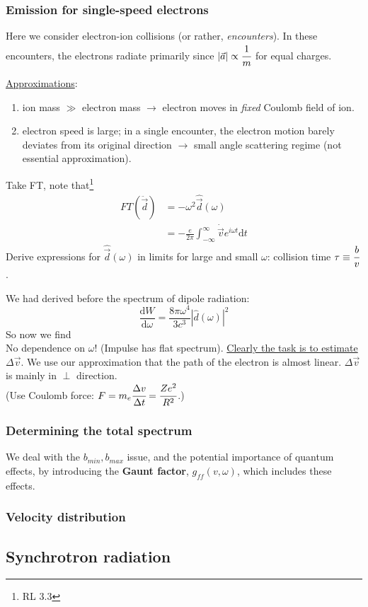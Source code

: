 \documentclass[12pt]{article}
\newcommand{\mar}[1]{\hspace{0pt}\marginpar{-\textcolor{black}{#1}-}}
\begin{document}
\subsubsection{Emission for single-speed electrons}
\mar{146}
Here we consider electron-ion collisions (or rather, \emph{encounters}).
In these encounters, the electrons radiate primarily since
$ |\vec{a}| \propto \cfrac{1}{m} $ for equal charges.

\underline{Approximations}:
\begin{enumerate}
    \item ion mass $\gg$ electron mass $\rightarrow$ electron moves in \emph{fixed}
        Coulomb field of ion.
    \item electron speed is large; in a single encounter, the electron motion barely
        deviates from its original direction $\rightarrow$ small angle scattering regime
        (not essential approximation).
\end{enumerate}
Take FT, note that\footnote{RL 3.3}
\begin{align*}
    FT (\ddot{\vec{d}})
    &= -\omega^{2} \hat{\vec{d}} (\omega)\\
    &= -\frac{e}{2\pi} \int_{-\infty}^{\infty}{
        \dot{\vec{v}} e^{i\omega{t}} \mathrm{d}t }
\end{align*}
Derive expressions for $\hat{\vec{d}}(\omega)$ in limits for large and small $\omega$:
collision time $\tau \equiv \cfrac{b}{v}$.

\mar{147}We had derived before the spectrum of dipole radiation:
\[
    \frac{\mathrm{d}W}{\mathrm{d}\omega}
    = \frac{8\pi\omega^{4}}{3c^{3}} | \hat{d}(\omega) |^{2}
    \]
So now we find
\[
    \]
No dependence on $\omega$! (Impulse has flat spectrum).
\underline{Clearly the task is to estimate $\Delta\vec{v}$}.
We use our approximation that the path of the electron is almost linear.
$\Delta\vec{v}$ is mainly in $\perp$ direction.
\[
    \]
(Use Coulomb force: $ F = m_{e}\cfrac{\Delta{v}}{\Delta{t}} = \cfrac{Ze^{2}}{R^{2}}$.)

\subsubsection{Determining the total spectrum}

\mar{148}

\mar{149}

We deal with the $b_{min}, b_{max}$ issue, and the potential importance of
quantum effects, by introducing the \textbf{Gaunt factor}, $g_{ff}(v,\omega)$,
which includes these effects.
\subsubsection{Velocity distribution}

\subsection{Synchrotron radiation}
\mar{167}
\end{document}
